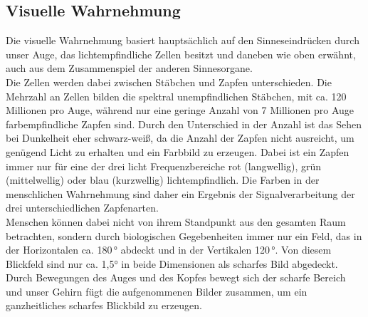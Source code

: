 \subsection{Visuelle Wahrnehmung}
Die visuelle Wahrnehmung basiert hauptsächlich auf den Sinneseindrücken durch unser Auge, das lichtempfindliche Zellen besitzt und daneben wie oben erwähnt, auch aus dem Zusammenspiel der anderen Sinnesorgane.\\
Die Zellen werden dabei zwischen Stäbchen und Zapfen unterschieden. Die Mehrzahl an Zellen bilden die spektral unempfindlichen Stäbchen, mit ca. 120 Millionen pro Auge, während nur eine geringe Anzahl von 7 Millionen pro Auge farbempfindliche Zapfen sind. Durch den Unterschied in der Anzahl ist das Sehen bei Dunkelheit eher schwarz-weiß, da die Anzahl der Zapfen nicht ausreicht, um genügend Licht zu erhalten und ein Farbbild zu erzeugen. Dabei ist ein Zapfen immer nur für eine der drei licht Frequenzbereiche rot (langwellig), grün (mittelwellig) oder blau (kurzwellig) lichtempfindlich. Die Farben in der menschlichen Wahrnehmung sind daher ein Ergebnis der Signalverarbeitung der drei unterschiedlichen Zapfenarten. \cite[Vgl. Seite 14]{Buhler.2017}\\
Menschen können dabei nicht von ihrem Standpunkt aus den gesamten Raum betrachten, sondern durch biologischen Gegebenheiten immer nur ein Feld, das in der Horizontalen ca. 180\,° abdeckt und in der Vertikalen 120\,°. Von diesem Blickfeld sind nur ca. 1,5° in beide Dimensionen als scharfes Bild abgedeckt. Durch Bewegungen des Auges und des Kopfes bewegt sich der scharfe Bereich und unser Gehirn fügt die aufgenommenen Bilder zusammen, um ein ganzheitliches scharfes Blickbild zu erzeugen. \cite[Vgl. Seite 14]{Buhler.2017}
